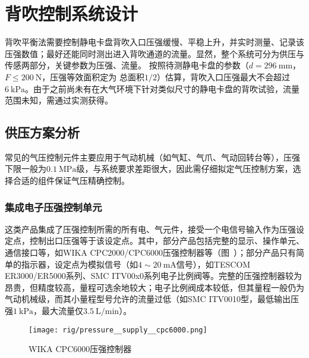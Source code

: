 \clearpage



\section{背吹控制系统设计}\label{sec:rig-pressure}

背吹平衡法需要控制静电卡盘背吹入口压强\footnotemark{}缓慢、平稳上升，并实时测量、记录该压强数值；最好还能同时测出进入背吹通道的流量。显然，整个系统可分为供压与传感两部分，关键参数为压强、流量。
按照待测静电卡盘的参数（$d = \SI{296}{\milli\meter}$，$F \leq \SI{200}{\newton}$，压强等效面积定为 总面积$1/2$）估算，背吹入口压强最大不会超过$\SI{6}{\kilo\pascal}$。由于之前尚未有在大气环境下针对类似尺寸的静电卡盘的背吹试验，流量范围未知，需通过实测获得。



\subsection{供压方案分析}\label{sec:rig-pressure-supply}

常见的气压控制元件主要应用于气动机械（如气缸、气爪、气动回转台等），压强下限一般为$\SI{0.1}{\mega\pascal}$级，与系统要求差距很大，因此需仔细拟定气压控制方案，选择合适的组件保证气压精确控制。

\subsubsection{集成电子压强控制单元}\label{sec:rig-pressure-supply-integrated}

这类产品集成了压强控制所需的所有电、气元件，接受一个电信号输入作为压强设定点，控制出口压强等于该设定点。其中，部分产品包括完整的显示、操作单元、通信接口等，如WIKA CPC2000/CPC6000压强控制器等（图~）；部分产品只有简单的指示器，设定点为模拟信号（如$\num{4} \sim \SI{20}{\milli\ampere}$信号），如TESCOM ER3000/ER5000系列、SMC ITV00x0系列电子比例阀等。完整的压强控制器较为昂贵，但精度较高，量程可选余地较大；电子比例阀成本较低，但其量程一般仍为气动机械级，而其小量程型号允许的流量过低（如SMC ITV0010型，最低输出压强$\SI{1}{\kilo\pascal}$，最大流量仅$\SI[per-mode=symbol]{3.5}{\liter\per\minute}$）。

\begin{figure}[tbh]
\centering
\texttt{[image: rig/pressure\_\_supply\_\_cpc6000.png]}
\caption{WIKA CPC6000压强控制器}
\label{fig:rig-pressure-supply-cpc6000}
\end{figure}

